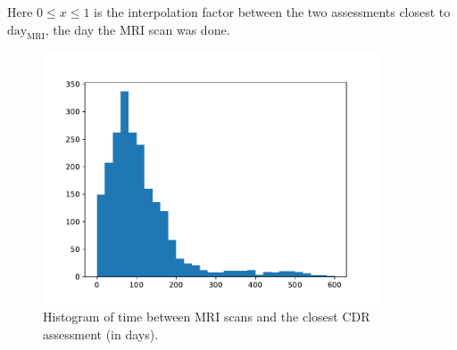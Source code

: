 \documentclass{kththesis}
\begin{document}
Here $0 \leq x \leq 1$ is the interpolation factor between the two assessments closest to $\text{day}_{\text{MRI}}$, the day the MRI scan was done.

\begin{figure}
  \begin{center}
    \includegraphics[width=100mm]{img/mri_cdr_offset.pdf}
    \caption{Histogram of time between MRI scans and the closest CDR assessment (in days).}
    \label{fig:mri_cdr_offset}
  \end{center}
\end{figure}
\end{document}
